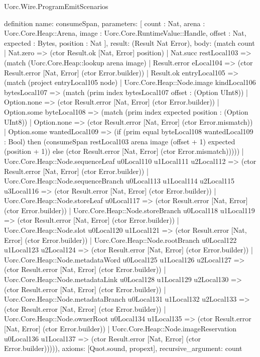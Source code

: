 \begin{lexlean}{Uorc.Wire.ProgramEmitScenarios}
\begin{semanticmodule}
definition{
  name: consumeSpan,
  parameters: [
    count : Nat,
    arena : Uorc.Core.Heap::Arena,
    image : Uorc.Core.RuntimeValue::Handle,
    offset : Nat,
    expected : Bytes,
    position : Nat
  ],
  result: (Result Nat Error),
  body: (match count
    | Nat.zero => (ctor Result.ok [Nat, Error] position)
    | Nat.succ restLocal103 => (match (Uorc.Core.Heap::lookup arena image)
      | Result.error eLocal104 => (ctor Result.error [Nat, Error] (ctor Error.builder))
      | Result.ok entryLocal105 => (match (project entryLocal105 node)
        | Uorc.Core.Heap::Node.image kindLocal106 bytesLocal107 => (match (prim index bytesLocal107 offset : (Option UInt8))
          | Option.none => (ctor Result.error [Nat, Error] (ctor Error.builder))
          | Option.some byteLocal108 => (match (prim index expected position : (Option UInt8))
            | Option.none => (ctor Result.error [Nat, Error] (ctor Error.mismatch))
            | Option.some wantedLocal109 => (if (prim equal byteLocal108 wantedLocal109 : Bool) then (consumeSpan restLocal103 arena image (offset + 1) expected (position + 1)) else (ctor Result.error [Nat, Error] (ctor Error.mismatch)))))
        | Uorc.Core.Heap::Node.sequenceLeaf u0Local110 u1Local111 u2Local112 => (ctor Result.error [Nat, Error] (ctor Error.builder))
        | Uorc.Core.Heap::Node.sequenceBranch u0Local113 u1Local114 u2Local115 u3Local116 => (ctor Result.error [Nat, Error] (ctor Error.builder))
        | Uorc.Core.Heap::Node.storeLeaf u0Local117 => (ctor Result.error [Nat, Error] (ctor Error.builder))
        | Uorc.Core.Heap::Node.storeBranch u0Local118 u1Local119 => (ctor Result.error [Nat, Error] (ctor Error.builder))
        | Uorc.Core.Heap::Node.slot u0Local120 u1Local121 => (ctor Result.error [Nat, Error] (ctor Error.builder))
        | Uorc.Core.Heap::Node.rootBranch u0Local122 u1Local123 u2Local124 => (ctor Result.error [Nat, Error] (ctor Error.builder))
        | Uorc.Core.Heap::Node.metadataWord u0Local125 u1Local126 u2Local127 => (ctor Result.error [Nat, Error] (ctor Error.builder))
        | Uorc.Core.Heap::Node.metadataLink u0Local128 u1Local129 u2Local130 => (ctor Result.error [Nat, Error] (ctor Error.builder))
        | Uorc.Core.Heap::Node.metadataBranch u0Local131 u1Local132 u2Local133 => (ctor Result.error [Nat, Error] (ctor Error.builder))
        | Uorc.Core.Heap::Node.ownerRoot u0Local134 u1Local135 => (ctor Result.error [Nat, Error] (ctor Error.builder))
        | Uorc.Core.Heap::Node.imageReservation u0Local136 u1Local137 => (ctor Result.error [Nat, Error] (ctor Error.builder))))),
  axioms: [Quot.sound, propext],
  recursive_argument: count
}


\end{semanticmodule}
\end{lexlean}
